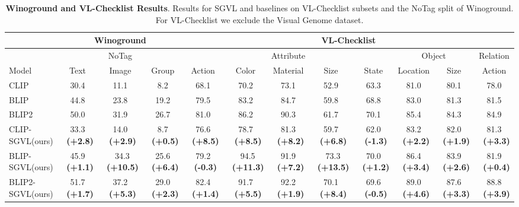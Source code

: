 \documentclass[11pt]{article}
\newcommand{\tablestyle}[2]{\setlength{\tabcolsep}{#1}\renewcommand{\arraystretch}{#2}\centering\footnotesize}
\newcommand{\gcol}[1]{{\bf \fontsize{6.5}{42}\selectfont \color{citecolor!80}~(#1)}}
\newcommand{\rcol}[1]{{\bf \fontsize{6.5}{42}\selectfont \color{lightred!180}~(#1)}}
\begin{document}
\begin{table*}[t!]
    \vspace{-1.0em}
    \centering
	\tablestyle{0.1pt}{1.}
	\scriptsize
    \begin{small}
    \begin{tabular}{l|ccc|ccccc|cc|c}
            \toprule
            &\multicolumn{3}{c|}{Winoground} &\multicolumn{8}{c}{VL-Checklist}\\ 
            \toprule
            &\multicolumn{3}{c|}{NoTag} &\multicolumn{5}{c|}{Attribute} &\multicolumn{2}{c|}{Object}&\multicolumn{1}{c}{Relation}\\
            Model & Text & Image & Group & Action & Color & Material & Size & State & Location & Size & Action\\
            \midrule            
            CLIP &30.4 &11.1 & 8.2 & 68.1 &70.2 & 73.1 & 52.9 &63.3 &81.0 & 80.1 & 78.0\\
            BLIP & 44.8 & 23.8 & 19.2 & 79.5 &83.2 & 84.7 & 59.8 &68.8 &83.0 & 81.3 & 81.5\\
            BLIP2 & 50.0  & 31.9 & 26.7  &81.0  & 86.2 & 90.3  & 61.7  & 70.1 & 85.4  & 84.3 & 84.9 \\
            \midrule
            CLIP-SGVL(ours) &33.3 \gcol{+2.8} & 14.0 \gcol{+2.9} & 8.7 \gcol{+0.5}  & 76.6 \gcol{+8.5} & 78.7 \gcol{+8.5} & 81.3 \gcol{+8.2} & 59.7 \gcol{+6.8}  & 62.0 \rcol{-1.3} & 83.2 \gcol{+2.2} & 82.0 \gcol{+1.9} & 81.3 \gcol{+3.3}\\
            BLIP-SGVL(ours) &45.9 \gcol{+1.1} &~34.3 \gcol{+10.5} & 25.6 \gcol{+6.4}  & 79.2 \rcol{-0.3} &~94.5 \gcol{+11.3} & 91.9 \gcol{+7.2} & ~73.3 \gcol{+13.5} & 70.0 \gcol{+1.2} & 86.4 \gcol{+3.4} & 83.9 \gcol{+2.6} & 81.9 \gcol{+0.4}\\
            BLIP2-SGVL(ours) &51.7 \gcol{+1.7}  & 37.2 \gcol{+5.3} & 29.0 \gcol{+2.3}   & 82.4 \gcol{+1.4}  & 91.7 \gcol{+5.5} & 92.2 \gcol{+1.9}  & 70.1 \gcol{+8.4}  & 69.6 \rcol{-0.5}  &89.0 \gcol{+4.6}  &87.6 \gcol{+3.3}  & 88.8 \gcol{+3.9} \\
            \bottomrule        
    \end{tabular}
    \end{small}
    \vspace{-1.0em}
    \caption{
    \textbf{Winoground and VL-Checklist Results}. Results for SGVL and baselines on VL-Checklist subsets and the NoTag split of  Winoground. For VL-Checklist  we exclude the Visual Genome dataset.  
}
    \vspace{-1.5em}



\end{table*}
\end{document}
